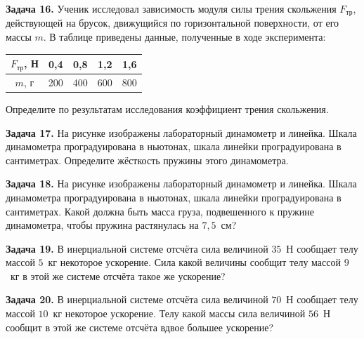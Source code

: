 \begin{taskbasic}[code={\label{task:dem26_v16_n2}}]
\textbf{Задача 16.} Ученик исследовал зависимость модуля силы трения скольжения $F_{\text{тр}}$, действующей на брусок, движущийся по горизонтальной поверхности, от его массы $m$. В таблице приведены данные, полученные в ходе эксперимента:
\begin{center}
\begin{tabular}{|c|c|c|c|c|}
\hline
$F_{\text{тр}}$, Н & 0,4 & 0,8 & 1,2 & 1,6 \\ \hline
$m$, г & 200 & 400 & 600 & 800 \\ \hline
\end{tabular}
\end{center}
Определите по результатам исследования коэффициент трения скольжения.

\end{taskbasic}

\begin{taskbasic}[code={\label{task:dem26_v17_n2}}]
\textbf{Задача 17.} На рисунке изображены лабораторный динамометр и линейка. Шкала динамометра проградуирована в ньютонах, шкала линейки проградуирована в сантиметрах. Определите жёсткость пружины этого динамометра.

\end{taskbasic}

\begin{taskbasic}[code={\label{task:dem26_v18_n2}}]
\textbf{Задача 18.} На рисунке изображены лабораторный динамометр и линейка. Шкала динамометра проградуирована в ньютонах, шкала линейки проградуирована в сантиметрах. Какой должна быть масса груза, подвешенного к пружине динамометра, чтобы пружина растянулась на $7{,}5$~см?

\end{taskbasic}

\begin{taskbasic}[code={\label{task:dem26_v19_n2}}]
\textbf{Задача 19.} В инерциальной системе отсчёта сила величиной $35$~Н сообщает телу массой $5$~кг некоторое ускорение. Сила какой величины сообщит телу массой $9$~кг в этой же системе отсчёта такое же ускорение?

\end{taskbasic}

\begin{taskbasic}[code={\label{task:dem26_v20_n2}}]
\textbf{Задача 20.} В инерциальной системе отсчёта сила величиной $70$~Н сообщает телу массой $10$~кг некоторое ускорение. Телу какой массы сила величиной $56$~Н сообщит в этой же системе отсчёта вдвое большее ускорение?

\end{taskbasic}
